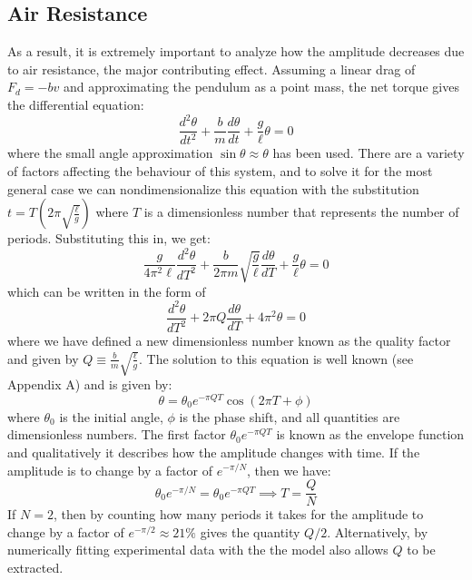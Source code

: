 \documentclass[%
 reprint,
 amsmath,amssymb
 aps,
]{revtex4-2}
\begin{document}
\subsection{Air Resistance}
As a result, it is extremely important to analyze how the amplitude decreases due to air resistance, the major contributing effect. Assuming a linear drag of $F_d=-bv$ and approximating the pendulum as a point mass, the net torque gives the differential equation:
\begin{equation}
    \frac{d^2\theta}{dt^2} + \frac{b}{m}\frac{d\theta}{dt} + \frac{g}{\ell}\theta  = 0
\end{equation}
where the small angle approximation $\sin\theta\approx\theta$ has been used. There are a variety of factors affecting the behaviour of this system, and to solve it for the most general case we can nondimensionalize this equation with the substitution $t=T\left(2\pi \sqrt{\frac{\ell}{g}}\right)$ where $T$ is a dimensionless number that represents the number of periods. Substituting this in, we get:
\begin{equation}
    \frac{g}{4\pi^2\ell}\frac{d^2\theta}{dT^2}+\frac{b}{2\pi m}\sqrt{\frac{g}{\ell}}\frac{d\theta}{dT}+\frac{g}{\ell}\theta = 0
    \label{eq:}
\end{equation}
which can be written in the form of
\begin{equation}
    \frac{d^2\theta}{dT^2}+2\pi Q\frac{d\theta}{dT}+4\pi^2\theta = 0
    \label{eq:}
\end{equation}
where we have defined a new dimensionless number known as the quality factor and given by $Q\equiv \frac{b}{m}\sqrt{\frac{\ell}{g}}$. The solution to this equation is well known (see Appendix A) and is given by:
\begin{equation}
    \theta = \theta_0e^{-\pi QT}\cos\left(2\pi T + \phi\right)
    \label{eq:}
\end{equation}
where $\theta_0$ is the initial angle, $\phi$ is the phase shift, and all quantities are dimensionless numbers. The first factor $\theta_0e^{-\pi QT}$ is known as the envelope function and qualitatively it describes how the amplitude changes with time. If the amplitude is to change by a factor of $e^{-\pi/N}$, then we have:
\begin{equation}
    \theta_0e^{-\pi/N}=\theta_0e^{-\pi QT} \implies T = \frac{Q}{N}
    \label{eq:}
\end{equation}
If $N=2$, then by counting how many periods it takes for the amplitude to change by a factor of $e^{-\pi/2}\approx 21\%$ gives the quantity $Q/2$. Alternatively, by numerically fitting experimental data with the the model also allows $Q$ to be extracted.
\end{document}
